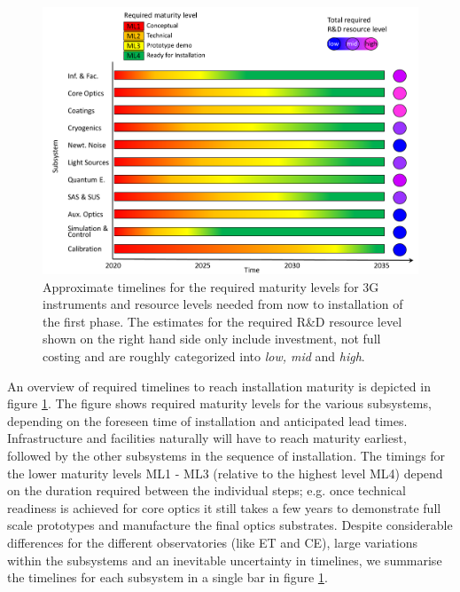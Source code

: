 \section*{}
\begin{figure}[ht]
\centering
\includegraphics*[width= \textwidth]{Figures/3G_Readiness_Levelsblue.pdf}
\caption{Approximate timelines for the required maturity levels for 3G instruments and resource levels needed from now to installation of the first phase. The estimates for the required R\&D resource level shown on the right hand side only include investment, not full costing and are roughly categorized into \textit{low, mid} and \textit{high}.\\
}
\label{fig:maturity}
\end{figure}

An overview of required timelines to reach installation maturity is depicted in figure \ref{fig:maturity}. The figure shows required maturity levels for the various subsystems, depending on the foreseen time of installation and anticipated lead times. Infrastructure and facilities naturally will have to reach maturity earliest, followed by the other subsystems in the sequence of installation. The timings for the lower maturity levels ML1 - ML3 (relative to the highest level ML4) depend on the duration required between the individual steps; e.g. once technical readiness is achieved for core optics it still takes a few years to demonstrate full scale prototypes and manufacture the final optics substrates. Despite considerable differences for the different observatories (like ET and CE), large variations within the subsystems and an inevitable uncertainty in timelines, we summarise the timelines  for each subsystem in a single bar in figure \ref{fig:maturity}.  

